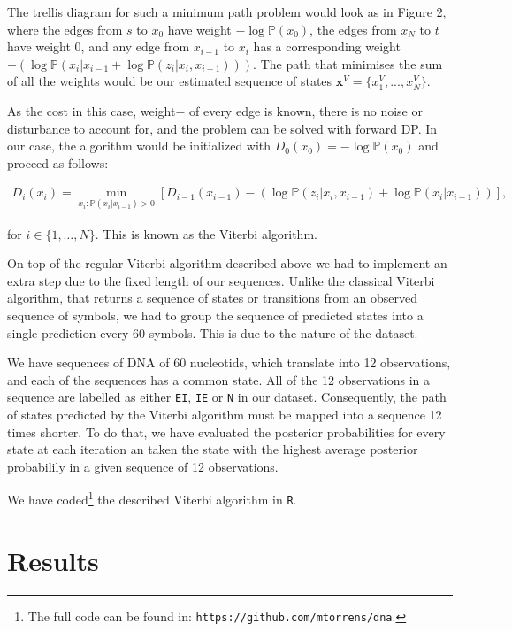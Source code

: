 \documentclass[a4paper, 11pt]{article} %
\begin{document}
The trellis diagram for such a minimum path problem would look as in Figure 2, where the edges from $s$ to $x_{0}$ have weight $-\log \mathbb{P}(x_{0})$, the edges from $x_{N}$ to $t$ have weight 0, and any edge from $x_{i-1}$ to $x_{i}$ has a corresponding weight $-\left( \log \mathbb{P}(x_{i}|x_{i-1} + \log \mathbb{P}(z_{i}|x_{i}, x_{i-1})) \right)$. The path that minimises the sum of all the weights would be our estimated sequence of states $\textbf{x}^V = \{ x_{1}^V, ..., x_N^V \}$.

As the cost \textendash in this case, weight$-$ of every edge is known, there is no noise or disturbance to account for, and the problem can be solved with forward DP. In our case, the algorithm would be initialized with $D_{0}(x_{0}) = -\log \mathbb{P}(x_{0})$ and proceed as follows:

\begin{eqnarray}
D_{i}(x_{i}) = \min_{ x_i: \mathbb{P}(x_i | x_{i-1}) > 0} \left[ D_{i-1}(x_{i-1}) - \left( \log \mathbb{P}(z_i | x_i, x_{i-1}) + \log \mathbb{P}(x_i | x_{i-1}) \right) \right],  \nonumber
\end{eqnarray}

for $i \in \{ 1, \dots, N \}$. This is known as the Viterbi algorithm.

On top of the regular Viterbi algorithm described above we had to implement an extra step due to the fixed length of our sequences. Unlike the classical Viterbi algorithm, that returns a sequence of states or transitions from an observed sequence of symbols, we had to group the sequence of predicted states into a single prediction every 60 symbols. This is due to the nature of the dataset. 

We have sequences of DNA of 60 nucleotids, which translate into 12 observations, and each of the sequences has a common state. All of the 12 observations in a sequence are labelled as either \texttt{EI}, \texttt{IE} or \texttt{N} in our dataset. Consequently, the path of states predicted by the Viterbi algorithm must be mapped into a sequence 12 times shorter. To do that, we have evaluated the posterior probabilities for every state at each iteration an taken the state with the highest average posterior probabilily in a given sequence of 12 observations. 

We have coded\footnote{The full code can be found in: \texttt{https://github.com/mtorrens/dna}.} the described Viterbi algorithm in \texttt{R}. 

\section*{Results}
\end{document}
